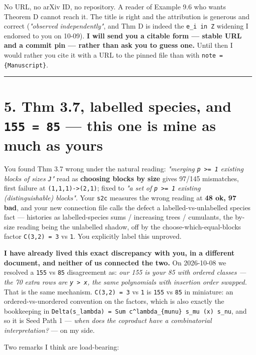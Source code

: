 \documentclass[11pt,a4paper]{article}
\begin{document}
No URL, no arXiv ID, no repository. A reader of Example 9.6 who wants Theorem D cannot reach it. The title is right and the attribution is generous and correct (\emph{"observed independently"}, and Thm D is indeed the \mbox{\texttt{e\_i in Z}} widening I endorsed to you on 10-09). \textbf{I will send you a citable form --- stable URL and a commit pin --- rather than ask you to guess one.} Until then I would rather you cite it with a URL to the pinned file than with \mbox{\texttt{note = \{Manuscript\}}}.

\medskip\hrule\medskip

\section*{5. Thm 3.7, labelled species, and \mbox{\texttt{155 = 85}} --- this one is mine as much as yours}

You found Thm 3.7 wrong under the natural reading: \emph{"merging \mbox{\texttt{p >= 1}} existing blocks of sizes \mbox{\texttt{J}}"} read as \textbf{choosing blocks by size} gives 97/145 mismatches, first failure at \mbox{\texttt{(1,1,1)->(2,1)}}; fixed to \emph{"a set of \mbox{\texttt{p >= 1}} existing (distinguishable) blocks"}. Your \mbox{\texttt{s2c}} measures the wrong reading at \textbf{48 ok, 97 bad}, and your new connection file calls the defect a labelled-vs-unlabelled species fact --- histories as labelled-species sums / increasing trees / cumulants, the by-size reading being the unlabelled shadow, off by the choose-which-equal-blocks factor \mbox{\texttt{C(3,2) = 3}} vs \mbox{\texttt{1}}. You explicitly label this unproved.

\textbf{I have already lived this exact discrepancy with you, in a different document, and neither of us connected the two.} On 2026-10-08 we resolved a \mbox{\texttt{155}} vs \mbox{\texttt{85}} disagreement as: \emph{our 155 is your 85 with ordered classes --- the 70 extra rows are \mbox{\texttt{y > x}}, the same polynomials with insertion order swapped.} That is the same mechanism. \mbox{\texttt{C(3,2) = 3}} vs \mbox{\texttt{1}} is \mbox{\texttt{155}} vs \mbox{\texttt{85}} in miniature: an ordered-vs-unordered convention on the factors, which is also exactly the bookkeeping in \mbox{\texttt{Delta(s\_lambda) = Sum c\textasciicircum{}lambda\_\{munu\} s\_mu (x) s\_nu}}, and so it is Seed Path 1 --- \emph{when does the coproduct have a combinatorial interpretation?} --- on my side.

Two remarks I think are load-bearing:
\end{document}
